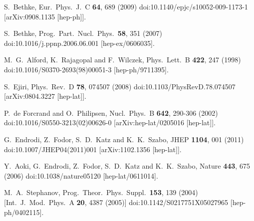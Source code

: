 \renewcommand{\bibname}{Reference}
\begin{thebibliography}{99}
  S.~Bethke,
  Eur.\ Phys.\ J.\ C {\bf 64}, 689 (2009)
  doi:10.1140/epjc/s10052-009-1173-1
  [arXiv:0908.1135 [hep-ph]].
 
  S.~Bethke,
  Prog.\ Part.\ Nucl.\ Phys.\  {\bf 58}, 351 (2007)
  doi:10.1016/j.ppnp.2006.06.001
  [hep-ex/0606035].
 
  M.~G.~Alford, K.~Rajagopal and F.~Wilczek,
  Phys.\ Lett.\ B {\bf 422}, 247 (1998)
  doi:10.1016/S0370-2693(98)00051-3
  [hep-ph/9711395].

  S.~Ejiri,
  Phys.\ Rev.\ D {\bf 78}, 074507 (2008)
  doi:10.1103/PhysRevD.78.074507
  [arXiv:0804.3227 [hep-lat]].
  
  
P.~de Forcrand and O.~Philipsen,
Nucl.\ Phys.\ B \textbf{642}, 290-306 (2002)
doi:10.1016/S0550-3213(02)00626-0
[arXiv:hep-lat/0205016 [hep-lat]].
  
  G.~Endrodi, Z.~Fodor, S.~D.~Katz and K.~K.~Szabo,
  JHEP {\bf 1104}, 001 (2011)
  doi:10.1007/JHEP04(2011)001
  [arXiv:1102.1356 [hep-lat]].
  
  
  
  Y.~Aoki, G.~Endrodi, Z.~Fodor, S.~D.~Katz and K.~K.~Szabo,
  Nature {\bf 443}, 675 (2006)
  doi:10.1038/nature05120
  [hep-lat/0611014].
 
  M.~A.~Stephanov,
  Prog.\ Theor.\ Phys.\ Suppl.\  {\bf 153}, 139 (2004)
  [Int.\ J.\ Mod.\ Phys.\ A {\bf 20}, 4387 (2005)]
  doi:10.1142/S0217751X05027965
  [hep-ph/0402115].
 

\end{thebibliography}
